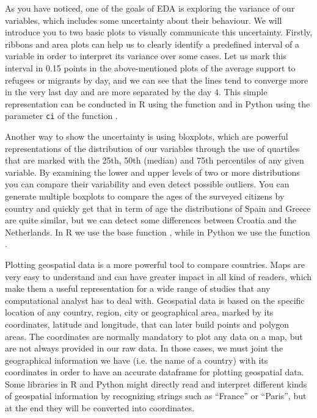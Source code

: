 
As you have noticed, one of the goals of EDA is exploring the variance of our variables, which includes some uncertainty about their behaviour. We will introduce you to two basic plots to visually communicate this uncertainty. Firstly, ribbons and area plots can help us to clearly identify a predefined interval of a variable in order to interpret its variance over some cases. Let us mark this interval in 0.15 points in the above-mentioned plots of the average support to refugees or migrants by day, and we can see that the lines tend to converge more in the very last day and are more separated by the day 4. This simple representation can be conducted in R using the  function  and in Python using the parameter \texttt{ci} of the  function .  


Another way to show the uncertainty is using bloxplots, which are powerful representations of the distribution of our variables through the use of quartiles that are marked with the 25th, 50th (median) and 75th percentiles of any given variable. By examining the lower and upper levels of two or more distributions you can compare their variability and even detect possible outliers. You can generate multiple boxplots to compare the ages of the surveyed citizens by country and quickly get that in term of age the distributions of Spain and Greece are quite similar, but we can detect some differences between Croatia and the Netherlands. In R we use the base function , while in Python we use the  function .


Plotting geospatial data is a more powerful tool to compare countries.  Maps are very easy to understand and can have greater impact in all kind of readers, which make them a useful representation for a wide range of studies that any computational analyst has to deal with. Geospatial data is based on the specific location of any country, region, city or geographical area, marked by its coordinates, latitude and longitude, that can later build points and polygon areas. The coordinates are normally mandatory to plot any data on a map, but are not always provided in our raw data. In those cases, we must joint the geographical information we have (i.e. the name of a country) with its coordinates in order to have an accurate dataframe for plotting geospatial data. Some libraries in R and Python might directly read and interpret different kinds of geospatial information by recognizing strings such as “France” or “Paris”, but at the end they will be converted into coordinates. 


